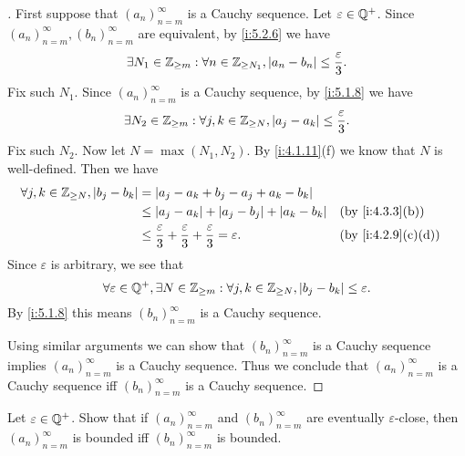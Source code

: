 \begin{proof}[]
  First suppose that \((a_n)_{n = m}^\infty\) is a Cauchy sequence.
  Let \(\varepsilon \in \mathbb{Q}^+\).
  Since \((a_n)_{n = m}^\infty, (b_n)_{n = m}^\infty\) are equivalent, by \cref{i:5.2.6} we have
  \[
    \exists N_1 \in \mathbb{Z}_{\geq m} : \forall n \in \mathbb{Z}_{\geq N_1}, \left\lvert a_n - b_n\right\rvert \leq \dfrac{\varepsilon}{3}.
  \]
  Fix such \(N_1\).
  Since \((a_n)_{n = m}^\infty\) is a Cauchy sequence, by \cref{i:5.1.8} we have
  \[
    \exists N_2 \in \mathbb{Z}_{\geq m} : \forall j, k \in \mathbb{Z}_{\geq N}, \left\lvert a_j - a_k\right\rvert \leq \dfrac{\varepsilon}{3}.
  \]
  Fix such \(N_2\).
  Now let \(N = \max(N_1, N_2)\).
  By \cref{i:4.1.11}(f) we know that \(N\) is well-defined.
  Then we have
  \begin{align*}
    \forall j, k \in \Z_{\geq N}, \abs{b_j - b_k} & = \abs{a_j - a_k + b_j - a_j + a_k - b_k}                                                                           \\
                                                  & \leq \abs{a_j - a_k} + \abs{a_j - b_j} + \abs{a_k - b_k}                                     &  & \by{i:4.3.3}[b]   \\
                                                  & \leq \dfrac{\varepsilon}{3} + \dfrac{\varepsilon}{3} + \dfrac{\varepsilon}{3} = \varepsilon. &  & \by{i:4.2.9}[c,d]
  \end{align*}
  Since \(\varepsilon\) is arbitrary, we see that
  \[
    \forall \varepsilon \in \mathbb{Q}^+, \exists N \in \mathbb{Z}_{\geq m} : \forall j, k \in \mathbb{Z}_{\geq N}, \left\lvert b_j - b_k\right\rvert \leq \varepsilon.
  \]
  By \cref{i:5.1.8} this means \((b_n)_{n = m}^\infty\) is a Cauchy sequence.

  Using similar arguments we can show that \((b_n)_{n = m}^\infty\) is a Cauchy sequence implies \((a_n)_{n = m}^\infty\) is a Cauchy sequence.
  Thus we conclude that \((a_n)_{n = m}^\infty\) is a Cauchy sequence iff \((b_n)_{n = m}^\infty\) is a Cauchy sequence.
\end{proof}

\begin{ex}\label{i:ex:5.2.2}
  Let \(\varepsilon \in \mathbb{Q}^+\).
  Show that if \((a_n)_{n = m}^{\infty}\) and \((b_n)_{n = m}^{\infty}\) are eventually \(\varepsilon\)-close, then \((a_n)_{n = m}^{\infty}\) is bounded iff \((b_n)_{n = m}^{\infty}\) is bounded.
\end{ex}

